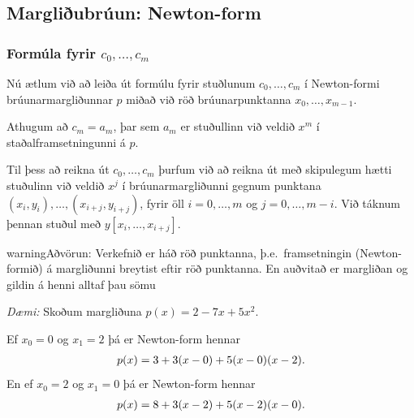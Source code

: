 \documentclass[a4paper,10pt,icelandic]{sphinxmanual}
\begin{document}

\subsection{Margliðubrúun: Newton-form}
\label{kafli03:margliubruun-newton-form}\label{kafli03:index-8}

\subsubsection{Formúla fyrir \(c_0, \ldots, c_m\)}
\label{kafli03:formula-fyrir}
Nú ætlum við að leiða út formúlu fyrir stuðlunum
\(c_0, \ldots, c_m\) í Newton-formi brúunarmargliðunnar \(p\)
miðað við röð brúunarpunktanna \(x_0, \ldots, x_{m-1}\).

Athugum að \(c_m = a_m\), þar sem \(a_m\) er stuðullinn við
veldið \(x^m\) í staðalframsetningunni á \(p\).

Til þess að reikna út \(c_0, \ldots, c_m\) þurfum við að reikna út
með skipulegum hætti stuðulinn við veldið \(x^j\) í
brúunarmargliðunni gegnum punktana
\((x_i,y_i), \ldots, (x_{i+j},y_{i+j})\), fyrir öll
\(i = 0, \ldots, m\) og \(j = 0, \ldots, m-i\). Við táknum
þennan stuðul með \(y[x_i, \ldots, x_{i+j}]\).

\begin{notice}{warning}{Aðvörun:}
Verkefnið er háð röð punktanna, þ.e. framsetningin (Newton-formið) á
margliðunni breytist eftir röð punktanna.
En auðvitað er margliðan og gildin á henni alltaf þau sömu

\emph{Dæmi:} Skoðum margliðuna \(p(x) = 2-7x+5x^2\).

Ef \(x_0=0\) og \(x_1=2\) þá er Newton-form hennar
\begin{gather}
\begin{split}p(x) = 3 + 3(x-0) + 5(x-0)(x-2).\end{split}\notag
\end{gather}
En ef \(x_0=2\) og \(x_1=0\) þá er Newton-form hennar
\begin{gather}
\begin{split}p(x) = 8 + 3(x-2) + 5(x-2)(x-0).\end{split}\notag
\end{gather}\end{notice}

\end{document}
